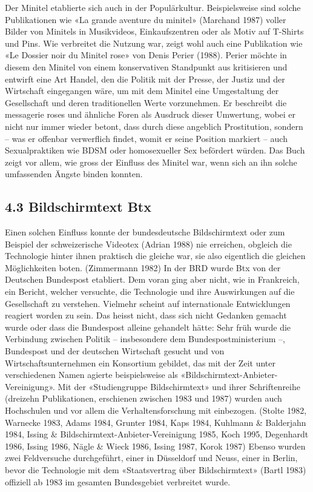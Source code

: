 \documentclass[a4paper,
fontsize=11pt,
oneside,
numbers=noperiodatend,
parskip=half-,
bibliography=totoc,
final
]{scrartcl}
\begin{document}
Der Minitel etablierte sich auch in der Populärkultur. Beispielsweise
sind solche Publikationen wie «La grande aventure du minitel» (Marchand
1987) voller Bilder von Minitels in Musikvideos, Einkaufszentren oder
als Motiv auf T-Shirts und Pins. Wie verbreitet die Nutzung war, zeigt
wohl auch eine Publikation wie «Le Dossier noir du Minitel rose» von
Denis Perier (1988). Perier möchte in diesem den Minitel von einem
konservativen Standpunkt aus kritisieren und entwirft eine Art Handel,
den die Politik mit der Presse, der Justiz und der Wirtschaft
eingegangen wäre, um mit dem Minitel eine Umgestaltung der Gesellschaft
und deren traditionellen Werte vorzunehmen. Er beschreibt die messagerie
roses und ähnliche Foren als Ausdruck dieser Umwertung, wobei er nicht
nur immer wieder betont, dass durch diese angeblich Prostitution,
sondern -- was er offenbar verwerflich findet, womit er seine Position
markiert -- auch Sexualpraktiken wie BDSM oder homosexueller Sex
befördert würden. Das Buch zeigt vor allem, wie gross der Einfluss des
Minitel war, wenn sich an ihn solche umfassenden Ängste binden konnten.

\hypertarget{bildschirmtext-btx}{%
\subsection{4.3 Bildschirmtext Btx}\label{bildschirmtext-btx}}

Einen solchen Einfluss konnte der bundesdeutsche Bildschirmtext oder zum
Beispiel der schweizerische Videotex (Adrian 1988) nie erreichen,
obgleich die Technologie hinter ihnen praktisch die gleiche war, sie
also eigentlich die gleichen Möglichkeiten boten. (Zimmermann 1982) In
der BRD wurde Btx von der Deutschen Bundespost etabliert. Dem voran ging
aber nicht, wie in Frankreich, ein Bericht, welcher versuchte, die
Technologie und ihre Auswirkungen auf die Gesellschaft zu verstehen.
Vielmehr scheint auf internationale Entwicklungen reagiert worden zu
sein. Das heisst nicht, dass sich nicht Gedanken gemacht wurde oder dass
die Bundespost alleine gehandelt hätte: Sehr früh wurde die Verbindung
zwischen Politik -- insbesondere dem Bundespostministerium --,
Bundespost und der deutschen Wirtschaft gesucht und von
Wirtschaftsunternehmen ein Konsortium gebildet, das mit der Zeit unter
verschiedenen Namen agierte beispielsweise als
«Bildschirmtext-Anbieter-Vereinigung». Mit der «Studiengruppe
Bildschirmtext» und ihrer Schriftenreihe (dreizehn Publikationen,
erschienen zwischen 1983 und 1987) wurden auch Hochschulen und vor allem
die Verhaltensforschung mit einbezogen. (Stolte 1982, Warnecke 1983,
Adams 1984, Grunter 1984, Kaps 1984, Kuhlmann \& Balderjahn 1984, Issing
\& Bildschirmtext-Anbieter-Vereinigung 1985, Koch 1995, Degenhardt 1986,
Issing 1986, Nägle \& Wieck 1986, Issing 1987, Korok 1987) Ebenso wurden
zwei Feldversuche durchgeführt, einer in Düsseldorf und Neuss, einer in
Berlin, bevor die Technologie mit dem «Staatsvertrag über
Bildschirmtext» (Bartl 1983) offiziell ab 1983 im gesamten Bundesgebiet
verbreitet wurde.
\end{document}
